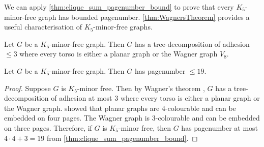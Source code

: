 We can apply \cref{thm:clique_sum_pagenumber_bound} to prove that every $K_5$-minor-free graph has bounded pagenumber. \cref{thm:WagnersTheorem} provides a useful characterisation of $K_5$-minor-free graphs. 
\begin{theorem}\label{thm:WagnersTheorem}
	Let \(G\) be a \(K_5\)-minor-free graph. Then \(G\) has a tree-decomposition of adhesion $\leq 3$ where every torso is either a planar graph or the Wagner graph \(V_8\).
\end{theorem}

\begin{theorem}
	Let \(G\) be a \(K_5\)-minor-free graph. Then \(G\) has pagenumber \(\leq 19\).
\end{theorem}

\begin{proof}
	Suppose \(G\) is \(K_5\)-minor free. Then by Wagner's theorem \cite{wagnerUeberEigenschaftEbenen1937}, \(G\) has a tree-decomposition of adhesion at most 3 where every torso is either a planar graph or the Wagner graph.
	\textcite{yannakakisEmbeddingPlanarGraphs1989} showed that planar graphs are \(4\)-colourable and can be embedded on four pages. The Wagner graph is \(3\)-colourable and can be embedded on three pages. Therefore, if \(G\) is \(K_5\)-minor free, then \(G\) has pagenumber at most \(4 \cdot 4 + 3 = 19\) from \cref{thm:clique_sum_pagenumber_bound}.
\end{proof}
